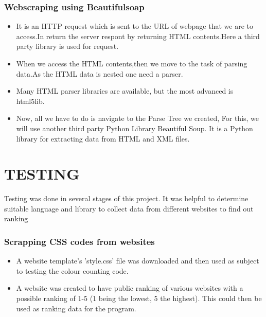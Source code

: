 \documentclass{fisatproject}
\begin{document}
  \subsection{Webscraping using Beautifulsoap}
  \begin{itemize}
 \item It is an HTTP request which is sent to the URL of webpage that we are to access.In return the server respont by returning HTML contents.Here a third party library is used for request.
 \item When we access the HTML contents,then we move to the task of parsing data.As the HTML data is nested one need a parser.
 \item Many HTML parser libraries are available, but the most advanced is html5lib.
  \item Now, all we have to do is navigate to the Parse Tree we created, For this, we will use another third party Python Library Beautiful Soup. It is a Python library for extracting data from HTML and XML files.
  \end{itemize}
\chapter{TESTING}

	Testing was done in several stages of this project. It was helpful to determine suitable language and library to collect data from different websites to find out ranking\\
	\subsection{Scrapping CSS codes from websites}
\begin{itemize}
	\item A website template's 'style.css' file was downloaded and then used as subject to testing the colour counting code.
	\item A website was created to have public ranking of various websites with a possible ranking of 1-5 (1 being the lowest, 5 the highest). This could then be used as ranking data for the program.
\end{itemize}
\end{document}
